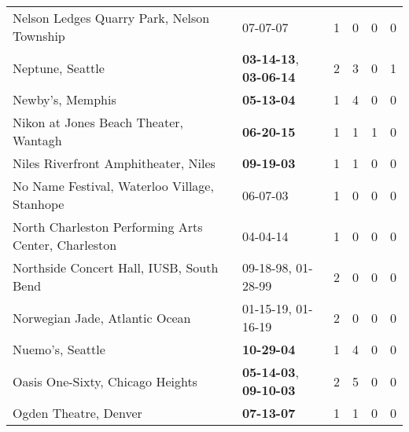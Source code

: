\begin{longtable}{p{}p{}p{}p{}p{}p{}}
                                   Nelson Ledges Quarry Park, Nelson Township &                                                07-07-07\textsuperscript{} &  1 &  0 &  0 &  0 \\
                                                             Neptune, Seattle &  \textbf{03-14-13\textsuperscript{}}, \textbf{03-06-14\textsuperscript{}} &  2 &  3 &  0 &  1 \\
                                                             Newby's, Memphis &                                       \textbf{05-13-04\textsuperscript{}} &  1 &  4 &  0 &  0 \\
                                        Nikon at Jones Beach Theater, Wantagh &                                       \textbf{06-20-15\textsuperscript{}} &  1 &  1 &  1 &  0 \\
                                         Niles Riverfront Amphitheater, Niles &                                       \textbf{09-19-03\textsuperscript{}} &  1 &  1 &  0 &  0 \\
                                 No Name Festival, Waterloo Village, Stanhope &                                                06-07-03\textsuperscript{} &  1 &  0 &  0 &  0 \\
                          North Charleston Performing Arts Center, Charleston &                                                04-04-14\textsuperscript{} &  1 &  0 &  0 &  0 \\
                                     Northside Concert Hall, IUSB, South Bend &                    09-18-98\textsuperscript{}, 01-28-99\textsuperscript{} &  2 &  0 &  0 &  0 \\
                                               Norwegian Jade, Atlantic Ocean &                    01-15-19\textsuperscript{}, 01-16-19\textsuperscript{} &  2 &  0 &  0 &  0 \\
                                                             Nuemo's, Seattle &                                       \textbf{10-29-04\textsuperscript{}} &  1 &  4 &  0 &  0 \\
                                             Oasis One-Sixty, Chicago Heights &  \textbf{05-14-03\textsuperscript{}}, \textbf{09-10-03\textsuperscript{}} &  2 &  5 &  0 &  0 \\
                                                        Ogden Theatre, Denver &                                       \textbf{07-13-07\textsuperscript{}} &  1 &  1 &  0 &  0 \\

\end{longtable}
